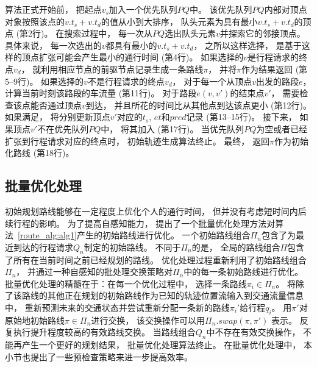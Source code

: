 算法正式开始前， 把起点$v_s$加入一个优先队列$PQ$中。 该优先队列$PQ$内部对顶点对象按照该点的$v.t_s+v.t_d$的值从小到大排序， 队头元素为具有最小$v.t_s+v.t_d$的顶点 (第2行)。 在搜索过程中， 每一次从$ PQ $选出队头元素$ v $并探索它的邻接顶点。 具体来说， 每一次选出的$ v $都具有最小的$v.t_s+v.t_d$， 之所以这样选择， 是基于这样的顶点扩张可能会产生最小的通行时间 (第4行)。 如果选择的$v$是行程请求的终点$v_d$， 就利用相应节点的前驱节点记录生成一条路线$\pi$， 并将$\pi$作为结果返回 (第5--9行)。 如果选择的$v$不是行程请求的终点$v_d$， 对于每一个从顶点$v$出发的路段$e$， 计算当前时刻该路段的车流量 (第11行)。
对于路段$e(v, v')$的结束点$v'$， 需要检查该点能否通过顶点$v$到达， 并且所花的时间比从其他点到达该点更小 (第12行)。 如果满足， 将分别更新顶点$v'$对应的$t_s$, $et$和$pred$记录 (第13--15行)。 接下来， 如果顶点$v'$不在优先队列$PQ$中， 将其加入 (第17行)。 当优先队列$PQ$为空或者已经扩张到行程请求对应的终点时， 初始轨迹生成算法终止。 最终， 返回$\pi$作为初始化路线 (第18行)。

    \subsection{批量优化处理}
    初始规划路线能够在一定程度上优化个人的通行时间， 但并没有考虑短时间内后续行程的影响。
    为了提高自感知能力， 提出了一个批量优化处理方法对算法~\ref{route_alg:alg1}产生的初始路线进行优化。 一个初始路线组合$\Pi_n$包含了为最近到达的行程请求$Q_n$制定的初始路线。 不同于$\Pi_n$的是， 全局的路线组合$\Pi$包含了所有在当前时间之前已经规划的路线。 优化处理过程重新利用了初始路线组合$\Pi_n$， 并通过一种自感知的批处理交换策略对$\Pi_n$中的每一条初始路线进行优化。 批量优化处理的精髓在于：在每一个优化过程中， 选择一条路线$\pi_i \in \Pi_n$。 将除了该路线的其他正在规划的初始路线作为已知的轨迹位置流输入到交通流量信息中， 重新预测未来的交通状态并尝试重新分配一条新的路线$\pi_i'$给行程$q_i$。 用$\pi'$对原始地初始路线$\pi \in \Pi_n$进行交换， 该交换操作可以用$\Pi_n.swap(\pi,\pi')$
   表示。 反复执行提升程度较高的有效路线交换。 当路线组合$Q_n$中不存在有效交换操作， 不能再产生一个更好的规划结果， 批量优化处理算法终止。 在批量优化处理中， 本小节也提出了一些预检查策略来进一步提高效率。

